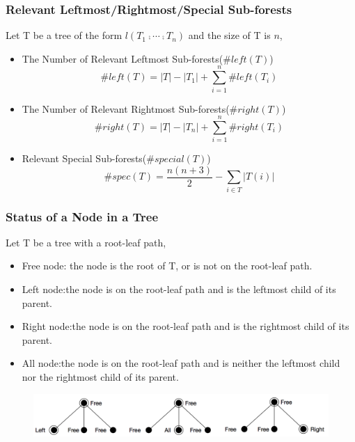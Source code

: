 \documentclass{beamer}
\begin{document}
\begin{frame}
\frametitle{Relevant Leftmost/Rightmost/Special Sub-forests}
Let T be a tree of the form $l(T_1 \comp \cdots \comp T_n)$ and the size of T is $n$, 
\begin{itemize}
\item The Number of Relevant Leftmost Sub-forests($\#left(T)$)
\begin{equation*}
\#left(T) = \left\vert T \right\vert - \left\vert T_1 \right\vert + \sum_{i=1}^{n}\#left(T_i)
\end{equation*}
\item The Number of Relevant Rightmost Sub-forests($\#right(T)$)
\begin{equation*}
\#right(T) = \left\vert T \right\vert - \left\vert T_n \right\vert + \sum_{i=1}^{n}\#right(T_i)
\end{equation*}
\item Relevant Special Sub-forests($\#special(T)$)
\begin{equation*}
\#spec(T) = \frac{n(n+3)}{2} - \sum_{i \in T}\left\vert T(i) \right\vert
\end{equation*}
\end{itemize}
\end{frame}
\begin{frame}
\frametitle{Status of a Node in a Tree}
Let T be a tree with a root-leaf path, 
\begin{itemize}
\item Free node: the node is the root of T, or is not on the root-leaf path.
\item Left node:the node is on the root-leaf path and is the leftmost child of its parent.
\item Right node:the node is on the root-leaf path and is the rightmost child of its parent.
\item All node:the node is on the root-leaf path and is neither the leftmost child nor the rightmost child of its parent.
\end{itemize}
\begin{figure}
	\includegraphics[width=1.0\linewidth]{Nodes}
	\centering
\end{figure}
\end{frame}
\end{document}
